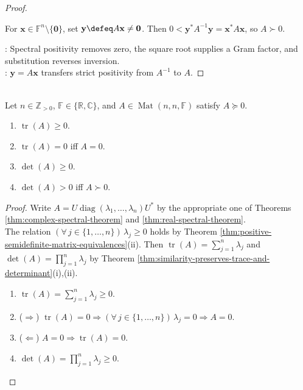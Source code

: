 \begin{theorem}
\begin{proof}
\begin{enumerate}[label=(\roman*)]
For $\mathbf{x}\in\mathbb{F}^n\setminus\{\mathbf{0}\}$, set $\mathbf{y}\defeq A\mathbf{x}\neq\mathbf{0}$. Then $0<\mathbf{y}^*A^{-1}\mathbf{y}=\mathbf{x}^*A\mathbf{x}$, so $A\succ0$.
\end{enumerate}
: Spectral positivity removes zero, the square root supplies a Gram factor, and substitution reverses inversion.\\
: $\mathbf{y}=A\mathbf{x}$ transfers strict positivity from $A^{-1}$ to $A$.
\end{proof}
\end{theorem}

\begin{proposition} \label{prop:trace-determinant-positive-semidefinite} \\
Let $n\in\mathbb{Z}_{>0}$, $\mathbb{F}\in\{\mathbb{R},\mathbb{C}\}$, and $A\in\operatorname{Mat}(n,n,\mathbb{F})$ satisfy $A\succeq0$.
\begin{enumerate}[label=(\roman*)]
\setlength{\itemsep}{0pt}
\item $\operatorname{tr}(A)\geq0$.
\item $\operatorname{tr}(A)=0$ iff $A=0$.
\item $\det(A)\geq0$.
\item $\det(A)>0$ iff $A\succ0$.
\end{enumerate}
\begin{proof}
Write $A=U\operatorname{diag}(\lambda_1,\ldots,\lambda_n)U^*$ by the appropriate one of Theorems \ref{thm:complex-spectral-theorem} and \ref{thm:real-spectral-theorem}.\\
The relation $(\forall\,j\in\{1,\ldots,n\})\,\lambda_j\geq0$ holds by Theorem \ref{thm:positive-semidefinite-matrix-equivalences}(ii). Then $\operatorname{tr}(A)=\sum\limits_{j=1}^{n}\lambda_j$ and $\det(A)=\prod\limits_{j=1}^{n}\lambda_j$ by Theorem \ref{thm:similarity-preserves-trace-and-determinant}(i),(ii).
\begin{enumerate}[label=(\roman*)]
\setlength{\itemsep}{0pt}
\item[$(i)$] $\operatorname{tr}(A)=\sum\limits_{j=1}^{n}\lambda_j\geq0$.
\item[$(ii)$] ($\Rightarrow$) $\operatorname{tr}(A)=0\Rightarrow(\forall\,j\in\{1,\ldots,n\})\,\lambda_j=0\Rightarrow A=0$.
\item[$(ii)$] ($\Leftarrow$) $A=0\Rightarrow\operatorname{tr}(A)=0$.
\item[$(iii)$] $\det(A)=\prod\limits_{j=1}^{n}\lambda_j\geq0$.

\end{enumerate}
\end{proof}
\end{proposition}
